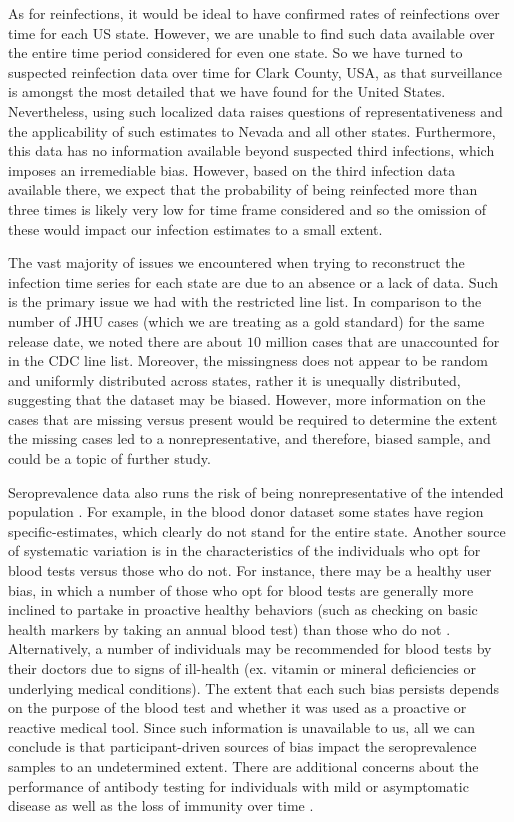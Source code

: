 \documentclass{article}
\begin{document}
As for reinfections, it would be ideal to have confirmed rates of reinfections over time for each US state. However, we are unable to find such data available over the entire time period considered for even one state. So we have turned to suspected reinfection data over time for Clark County, USA, as that surveillance is amongst the most detailed that we have found for the United States. Nevertheless, using such localized data raises questions of representativeness and the applicability of such estimates to Nevada and all other states. Furthermore, this data has no information available beyond suspected third infections, which imposes an irremediable bias. However, based on the third infection data available there, we expect that the probability of being reinfected more than three times is likely very low for time frame considered and so the omission of these would impact our infection estimates to a small extent. 

The vast majority of issues we encountered when trying to reconstruct the infection time series for each state are due to an absence or a lack of data. Such is the primary issue we had with the restricted line list. In comparison to the number of JHU cases (which we are treating as a gold standard) for the same release date, we noted there are about $10$ million cases that are unaccounted for in the CDC line list. Moreover, the missingness does not appear to be random and uniformly distributed across states, rather it is unequally distributed, suggesting that the dataset may be biased. However, more information on the cases that are missing versus present would be required to determine the extent the missing cases led to a nonrepresentative, and therefore, biased sample, and could be a topic of further study.

Seroprevalence data also runs the risk of being nonrepresentative of the intended population \citep{bajema2021estimated}. For example, in the blood donor dataset some states have region specific-estimates, which clearly do not stand for the entire state. Another source of systematic variation is in the characteristics of the individuals who opt for blood tests versus those who do not. For instance, there may be a healthy user bias, in which a number of those who opt for blood tests are generally more inclined to partake in proactive healthy behaviors (such as checking on basic health markers by taking an annual blood test) than those who do not \citep{parsley2018blood}. Alternatively, a number of individuals may be recommended for blood tests by their doctors due to signs of ill-health (ex. vitamin or mineral deficiencies or underlying medical conditions). The extent that each such bias persists depends on the purpose of the blood test and whether it was used as a proactive or reactive medical tool. Since such information is unavailable to us, all we can conclude is that participant-driven sources of bias impact the seroprevalence samples to an undetermined extent. There are additional concerns about the performance of antibody testing for individuals with mild or asymptomatic disease as well as the loss of immunity over time \citep{kaku2021performance, seow2020longitudinal, ibarrondo2020rapid}.
\end{document}
